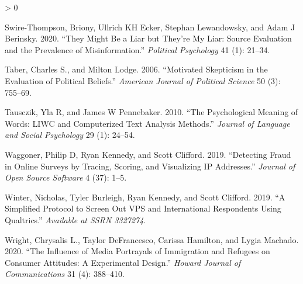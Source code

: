 \documentclass[
  12pt,
]{article}
\newlength{\cslhangindent}
\newenvironment{CSLReferences}[2] %
 {%
  \setlength{\parindent}{0pt}
  \ifodd #1 \everypar{\setlength{\hangindent}{\cslhangindent}}\ignorespaces\fi
  \ifnum #2 > 0
  \setlength{\parskip}{#2\baselineskip}
  \fi
 }%
 {}
\begin{document}
\begin{CSLReferences}{1}{0}
\leavevmode\hypertarget{ref-swire2020they}{}%
Swire-Thompson, Briony, Ullrich KH Ecker, Stephan Lewandowsky, and Adam
J Berinsky. 2020. {``They Might Be a Liar but They're My Liar: Source
Evaluation and the Prevalence of Misinformation.''} \emph{Political
Psychology} 41 (1): 21--34.

\leavevmode\hypertarget{ref-Taber2006}{}%
Taber, Charles S., and Milton Lodge. 2006. {``Motivated Skepticism in
the Evaluation of Political Beliefs.''} \emph{American Journal of
Political Science} 50 (3): 755--69.

\leavevmode\hypertarget{ref-tausczik2010psychological}{}%
Tausczik, Yla R, and James W Pennebaker. 2010. {``The Psychological
Meaning of Words: LIWC and Computerized Text Analysis Methods.''}
\emph{Journal of Language and Social Psychology} 29 (1): 24--54.

\leavevmode\hypertarget{ref-waggoner2019detecting}{}%
Waggoner, Philip D, Ryan Kennedy, and Scott Clifford. 2019. {``Detecting
Fraud in Online Surveys by Tracing, Scoring, and Visualizing IP
Addresses.''} \emph{Journal of Open Source Software} 4 (37): 1--5.

\leavevmode\hypertarget{ref-winter2019simplified}{}%
Winter, Nicholas, Tyler Burleigh, Ryan Kennedy, and Scott Clifford.
2019. {``A Simplified Protocol to Screen Out VPS and International
Respondents Using Qualtrics.''} \emph{Available at SSRN 3327274}.

\leavevmode\hypertarget{ref-Wright2020}{}%
Wright, Chrysalis L., Taylor DeFrancesco, Carissa Hamilton, and Lygia
Machado. 2020. {``The Influence of Media Portrayals of Immigration and
Refugees on Consumer Attitudes: A Experimental Design.''} \emph{Howard
Journal of Communications} 31 (4): 388--410.

\end{CSLReferences}
\end{document}

